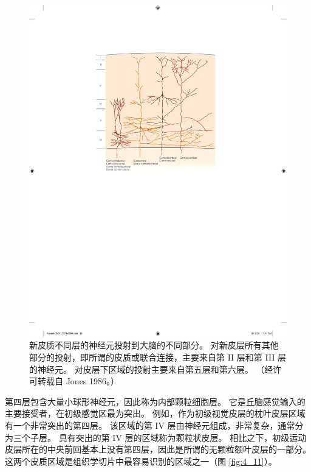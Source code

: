 \begin{figure}[htbp]
	\centering
	\includegraphics[width=1.0\linewidth]{chap04/fig_4_10}
	\caption{新皮质不同层的神经元投射到大脑的不同部分。 
		对新皮层所有其他部分的投射，即所谓的皮质或联合连接，主要来自第 II 层和第 III 层的神经元。 
		对皮层下区域的投射主要来自第五层和第六层。 （经许可转载自 Jones 1986。）}
	\label{fig:4_10}
\end{figure}


第四层包含大量小球形神经元，因此称为内部颗粒细胞层。 
它是丘脑感觉输入的主要接受者，在初级感觉区最为突出。 
例如，作为初级视觉皮层的枕叶皮层区域有一个非常突出的第四层。 
该区域的第 IV 层由神经元组成，非常复杂，通常分为三个子层。 
具有突出的第 IV 层的区域称为颗粒状皮层。 
相比之下，初级运动皮层所在的中央前回基本上没有第四层，因此是所谓的无颗粒额叶皮层的一部分。 
这两个皮质区域是组织学切片中最容易识别的区域之一（图 \ref{fig:4_11}）。

